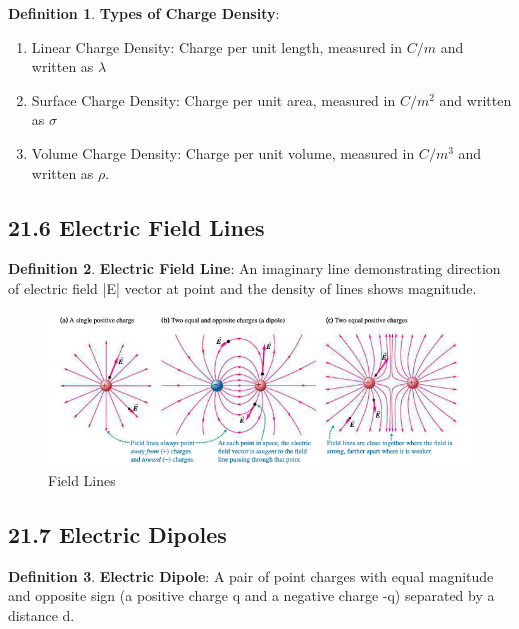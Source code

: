 \documentclass[12pt]{amsart}
\theoremstyle{definition}
\newtheorem{definition}{Definition} %
\numberwithin{equation}{theorem}    %
\begin{document}
\begin{definition}
    \textbf{Types of Charge Density}: 
    \begin{enumerate}
        \item Linear Charge Density: Charge per unit length, measured in $C/m$
        and written as $\lambda$
        \item Surface Charge Density: Charge per unit area, measured in $C/m^2$ 
        and written as $\sigma$
        \item Volume Charge Density: Charge per unit volume, measured in 
        $C/m^3$ and written as $\rho$.
    \end{enumerate}
\end{definition}

\subsection*{21.6 Electric Field Lines}
\begin{definition}
    \textbf{Electric Field Line}:
    An imaginary line demonstrating direction of 
    electric field |E| vector at point and the density of lines shows magnitude.
\end{definition}

\begin{figure}[H]
    \centering
    \includegraphics[width=5in]{Media/Fieldline.png}
    \caption{Field Lines}
    \label{Field Lines}
\end{figure}

\subsection*{21.7 Electric Dipoles}

\begin{definition}
    \textbf{Electric Dipole}:
    A pair of point charges with equal magnitude and 
    opposite sign (a positive charge q and a negative charge -q) separated by a
     distance d.
\end{definition}
\end{document}
